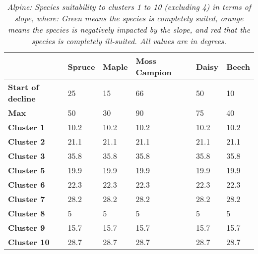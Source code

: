 \begin{table}[htb!]
  \centering
	    \begin{tabular}{|p{2cm}|p{2.5cm}|p{2.5cm}|p{2.5cm}|p{2.5cm}|p{2.5cm}|}
		\hline	
  	     & \textbf{Spruce} & \textbf{Maple} & \textbf{Moss Campion} & \textbf{Daisy} & \textbf{Beech}\\
  	    \hline	
		\textbf{Start of decline} & 
		25 & 
		15 & 
		66 & 
		50 & 
		10 \\
		\hline
		\textbf{Max} & 
		50 & 
		30 & 
		90 & 
		75 & 
		40 \\
		\hline
		\textbf{Cluster 1} & 
		\cellcolor{color_green}10.2 &
		\cellcolor{color_green}10.2 &
		\cellcolor{color_green}10.2 &
		\cellcolor{color_green}10.2 &
		\cellcolor{color_orange}10.2 \\
		\hline
		\textbf{Cluster 2} & 
		\cellcolor{color_orange}21.1 &
		\cellcolor{color_orange}21.1 &
		\cellcolor{color_green}21.1 &
		\cellcolor{color_green}21.1 &
		\cellcolor{color_orange}21.1 \\
		\hline
		\textbf{Cluster 3} & 
		\cellcolor{color_orange}35.8 & 
		\cellcolor{color_red}35.8 & 
		\cellcolor{color_green}35.8 & 
		\cellcolor{color_green}35.8 & 
		\cellcolor{color_orange}35.8\\
		\hline
		\textbf{Cluster 5} & 
		\cellcolor{color_green}19.9 & 
		\cellcolor{color_orange}19.9 & 
		\cellcolor{color_green}19.9 & 
		\cellcolor{color_green}19.9 & 
		\cellcolor{color_orange}19.9\\
		\hline
		\textbf{Cluster 6} & 
		\cellcolor{color_green}22.3 & 
		\cellcolor{color_orange}22.3 & 
		\cellcolor{color_green}22.3 & 
		\cellcolor{color_green}22.3 & 
		\cellcolor{color_orange}22.3\\
		\hline
		\textbf{Cluster 7} & 
		\cellcolor{color_orange}28.2 & 
		\cellcolor{color_orange}28.2 & 
		\cellcolor{color_green}28.2 & 
		\cellcolor{color_green}28.2 & 
		\cellcolor{color_orange}28.2\\
		\hline
		\textbf{Cluster 8} & 
		\cellcolor{color_green}5 & 
		\cellcolor{color_green}5 & 
		\cellcolor{color_green}5 & 
		\cellcolor{color_green}5 & 
		\cellcolor{color_green}5\\
		\hline
		\textbf{Cluster 9} & 
		\cellcolor{color_green}15.7 & 
		\cellcolor{color_orange}15.7 & 
		\cellcolor{color_green}15.7 & 
		\cellcolor{color_green}15.7 & 
		\cellcolor{color_orange}15.7\\
		\hline
		\textbf{Cluster 10} & 
		\cellcolor{color_orange}28.7 & 
		\cellcolor{color_orange}28.7 & 
		\cellcolor{color_green}28.7 & 
		\cellcolor{color_green}28.7 & 
		\cellcolor{color_orange}28.7\\
		\hline
		\end{tabular}
		\caption{\textit{Alpine: Species suitability to clusters 1 to 10 (excluding 4) in terms of slope, where: Green means the species is completely suited, orange means the species is negatively impacted by the slope, and red that the species is completely ill-suited. All values are in \textit{degrees}.}}
	  \label{tab:results_alpine_species_slope_suitability}
\end{table}

